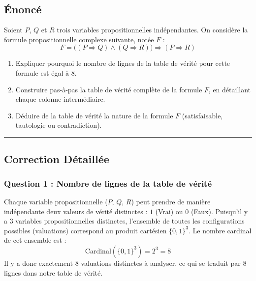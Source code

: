 \documentclass[11pt,a4paper]{article}
\begin{document}
\hypertarget{uxe9noncuxe9}{%
\subsection{Énoncé}\label{uxe9noncuxe9}}

Soient \(P\), \(Q\) et \(R\) trois variables propositionnelles
indépendantes. On considère la formule propositionnelle complexe
suivante, notée \(F\) :
\[F = \big( (P \Rightarrow Q) \land (Q \Rightarrow R) \big) \Rightarrow (P \Rightarrow R)\]

\begin{enumerate}
\def\labelenumi{\arabic{enumi}.}
\tightlist
\item
  Expliquer pourquoi le nombre de lignes de la table de vérité pour
  cette formule est égal à \(8\).
\item
  Construire pas-à-pas la table de vérité complète de la formule \(F\),
  en détaillant chaque colonne intermédiaire.
\item
  Déduire de la table de vérité la nature de la formule \(F\)
  (satisfaisable, tautologie ou contradiction).
\end{enumerate}

\begin{center}\rule{0.5\linewidth}{0.5pt}\end{center}

\hypertarget{correction-duxe9tailluxe9e}{%
\subsection{Correction Détaillée}\label{correction-duxe9tailluxe9e}}

\hypertarget{question-1-nombre-de-lignes-de-la-table-de-vuxe9rituxe9}{%
\subsubsection{Question 1 : Nombre de lignes de la table de
vérité}\label{question-1-nombre-de-lignes-de-la-table-de-vuxe9rituxe9}}

Chaque variable propositionnelle (\(P\), \(Q\), \(R\)) peut prendre de
manière indépendante deux valeurs de vérité distinctes : \(1\) (Vrai) ou
\(0\) (Faux). Puisqu'il y a \(3\) variables propositionnelles
distinctes, l'ensemble de toutes les configurations possibles
(valuations) correspond au produit cartésien \(\{0, 1\}^3\). Le nombre
cardinal de cet ensemble est : \[\text{Cardinal}(\{0, 1\}^3) = 2^3 = 8\]
Il y a donc exactement \(8\) valuations distinctes à analyser, ce qui se
traduit par \(8\) lignes dans notre table de vérité.
\end{document}
